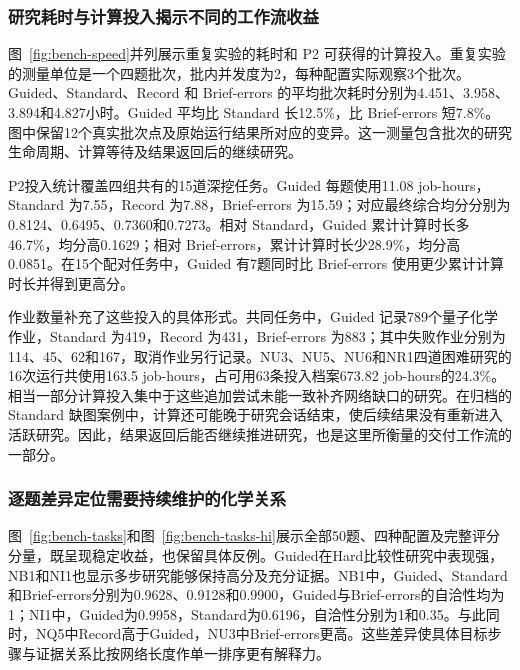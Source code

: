 \subsubsection{研究耗时与计算投入揭示不同的工作流收益}

图~\ref{fig:bench-speed}并列展示重复实验的耗时和 P2 可获得的计算投入。重复实验的测量单位是一个四题批次，批内并发度为2，每种配置实际观察3个批次。Guided、Standard、Record 和 Brief-errors 的平均批次耗时分别为4.451、3.958、3.894和4.827小时。Guided 平均比 Standard 长12.5\%，比 Brief-errors 短7.8\%。图中保留12个真实批次点及原始运行结果所对应的变异。这一测量包含批次的研究生命周期、计算等待及结果返回后的继续研究。

P2投入统计覆盖四组共有的15道深挖任务。Guided 每题使用11.08 job-hours，Standard 为7.55，Record 为7.88，Brief-errors 为15.59；对应最终综合均分分别为0.8124、0.6495、0.7360和0.7273。相对 Standard，Guided 累计计算时长多46.7\%，均分高0.1629；相对 Brief-errors，累计计算时长少28.9\%，均分高0.0851。在15个配对任务中，Guided 有7题同时比 Brief-errors 使用更少累计计算时长并得到更高分。

作业数量补充了这些投入的具体形式。共同任务中，Guided 记录789个量子化学作业，Standard 为419，Record 为431，Brief-errors 为883；其中失败作业分别为114、45、62和167，取消作业另行记录。NU3、NU5、NU6和NR1四道困难研究的16次运行共使用163.5 job-hours，占可用63条投入档案673.82 job-hours的24.3\%。相当一部分计算投入集中于这些追加尝试未能一致补齐网络缺口的研究。在归档的 Standard 缺图案例中，计算还可能晚于研究会话结束，使后续结果没有重新进入活跃研究。因此，结果返回后能否继续推进研究，也是这里所衡量的交付工作流的一部分。





\FloatBarrier

\subsubsection{逐题差异定位需要持续维护的化学关系}

图~\ref{fig:bench-tasks}和图~\ref{fig:bench-tasks-hi}展示全部50题、四种配置及完整评分分量，既呈现稳定收益，也保留具体反例。Guided在Hard比较性研究中表现强，NB1和NI1也显示多步研究能够保持高分及充分证据。NB1中，Guided、Standard和Brief-errors分别为0.9628、0.9128和0.9900，Guided与Brief-errors的自洽性均为1；NI1中，Guided为0.9958，Standard为0.6196，自洽性分别为1和0.35。与此同时，NQ5中Record高于Guided，NU3中Brief-errors更高。这些差异使具体目标步骤与证据关系比按网络长度作单一排序更有解释力。

